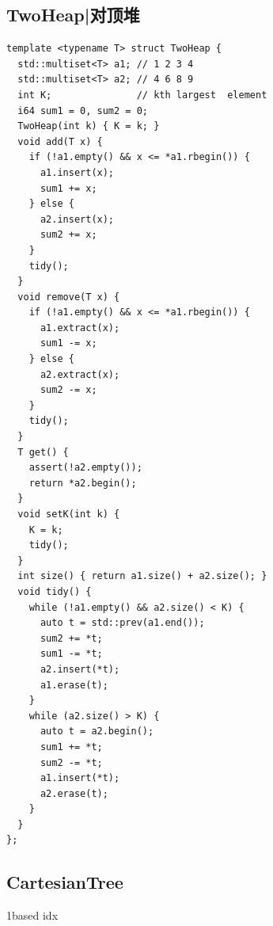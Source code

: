 \documentclass[UTF8,twoside]{ctexart}
\begin{document}
\subsection{TwoHeap|对顶堆}
\begin{lstlisting}
template <typename T> struct TwoHeap {
  std::multiset<T> a1; // 1 2 3 4
  std::multiset<T> a2; // 4 6 8 9
  int K;               // kth largest  element
  i64 sum1 = 0, sum2 = 0;
  TwoHeap(int k) { K = k; }
  void add(T x) {
    if (!a1.empty() && x <= *a1.rbegin()) {
      a1.insert(x);
      sum1 += x;
    } else {
      a2.insert(x);
      sum2 += x;
    }
    tidy();
  }
  void remove(T x) {
    if (!a1.empty() && x <= *a1.rbegin()) {
      a1.extract(x);
      sum1 -= x;
    } else {
      a2.extract(x);
      sum2 -= x;
    }
    tidy();
  }
  T get() {
    assert(!a2.empty());
    return *a2.begin();
  }
  void setK(int k) {
    K = k;
    tidy();
  }
  int size() { return a1.size() + a2.size(); }
  void tidy() {
    while (!a1.empty() && a2.size() < K) {
      auto t = std::prev(a1.end());
      sum2 += *t;
      sum1 -= *t;
      a2.insert(*t);
      a1.erase(t);
    }
    while (a2.size() > K) {
      auto t = a2.begin();
      sum1 += *t;
      sum2 -= *t;
      a1.insert(*t);
      a2.erase(t);
    }
  }
};
\end{lstlisting}
\subsection{CartesianTree}
1based idx
\end{document}
